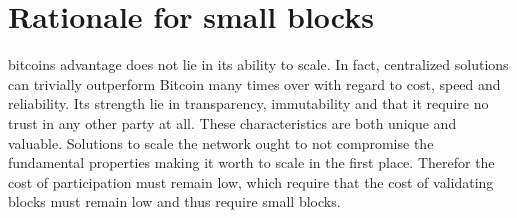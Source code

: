 \section{Rationale for small blocks}

\gls{bitcoin}s advantage does not lie in its ability to scale. In fact, centralized solutions can trivially outperform Bitcoin many times over with regard to cost, speed and reliability. Its strength lie in transparency, immutability and that it require no trust in any other party at all. These characteristics are both unique and valuable. Solutions to scale the network ought to not compromise the fundamental properties making it worth to scale in the first place. Therefor the cost of participation must remain low, which require that the cost of validating blocks must remain low and thus require small blocks.

